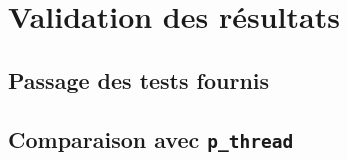 \documentclass[a4paper]{article}
\begin{document}
\section{Validation des résultats}

\subsection{Passage des tests fournis}
\subsection{Comparaison avec \texttt{p\_thread}}
\end{document}
